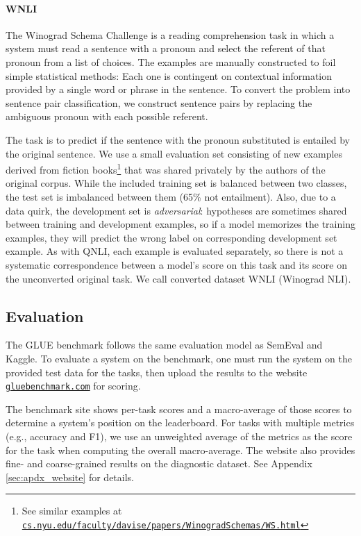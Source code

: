 \paragraph{WNLI}
The Winograd Schema Challenge \citep{levesque2011winograd} is a reading comprehension task in which a system must read a sentence with a pronoun and select the referent of that pronoun from a list of choices. The examples are manually constructed to foil simple statistical methods: Each one is contingent on contextual information provided by a single word or phrase in the sentence. To convert the problem into sentence pair classification, we construct sentence pairs by replacing the ambiguous pronoun with each possible referent.

The task is to predict if the sentence with the pronoun substituted is entailed by the original sentence. We use a small evaluation set consisting of new examples derived from fiction books\footnote{See similar examples at 
\href{https://cs.nyu.edu/faculty/davise/papers/WinogradSchemas/WS.html}{\tt cs.nyu.edu/\allowbreak faculty/\allowbreak davise/\allowbreak papers/\allowbreak WinogradSchemas/\allowbreak WS.html}} that was shared privately by the authors of the original corpus. While the included training set is balanced between two classes,  the test set is imbalanced between them (65\% not entailment). Also, due to a data quirk, the development set is \textit{adversarial}: hypotheses are sometimes shared between training and development examples, so if a model memorizes the training examples, they will predict the wrong label on corresponding development set example. As with QNLI, each example is evaluated separately, so there is not a systematic correspondence between a model's score on this task and its score on the unconverted original task. We call converted dataset WNLI (Winograd NLI).

\subsection{Evaluation}
The GLUE benchmark follows the same evaluation model as SemEval and Kaggle. To evaluate a system on the benchmark, one must run the system on the provided test data for the tasks, then upload the results to the website \href{https://gluebenchmark.com}{\tt gluebenchmark.com} for scoring. 

The benchmark site shows per-task scores and a macro-average of those scores to determine a system's position on the leaderboard. For tasks with multiple metrics (e.g., accuracy and F1), we use an unweighted average of the metrics as the score for the task when computing the overall macro-average. The website also provides fine- and coarse-grained results on the diagnostic dataset. See Appendix \ref{sec:apdx_website} for details.


